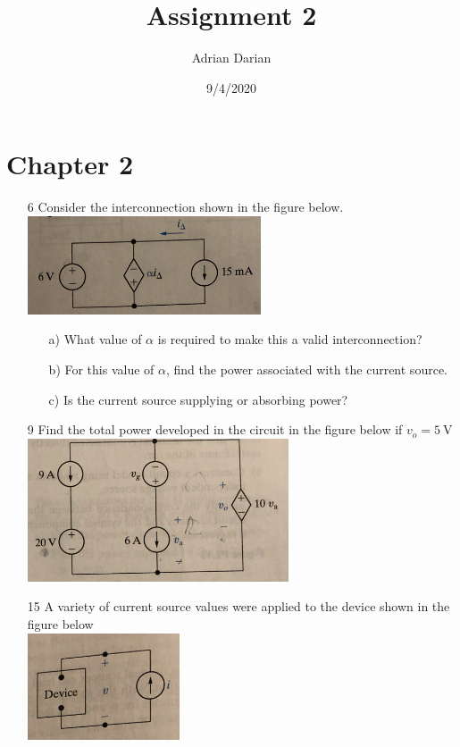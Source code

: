 \documentclass[a4paper]{article}
\title{Assignment 2}
\author{Adrian Darian}
\date{9/4/2020}
\begin{document}
  
\maketitle
  
\section*{Chapter 2}
\begin{itemize}
	\item[6] Consider the interconnection shown in the figure below. \\
	      \includegraphics{P2-6.png} \\ 
	      \begin{itemize}
	      	\item[a)] What value of $\alpha$ is required to make this a valid interconnection?
	      	\item[b)] For this value of $\alpha$, find the power associated with the current source.
	      	\item[c)] Is the current source supplying or absorbing power?
	      \end{itemize} 
	\item[9] Find the total power developed in the circuit in the figure below if $v_{o} = \SI{5}{\volt}$ \\
	      \includegraphics{P2-9.png} \\
	\item[15] A variety of current source values were applied to the device shown in the figure below \\
	      \includegraphics{P2-15.png} \\

\end{itemize}
\end{document}
